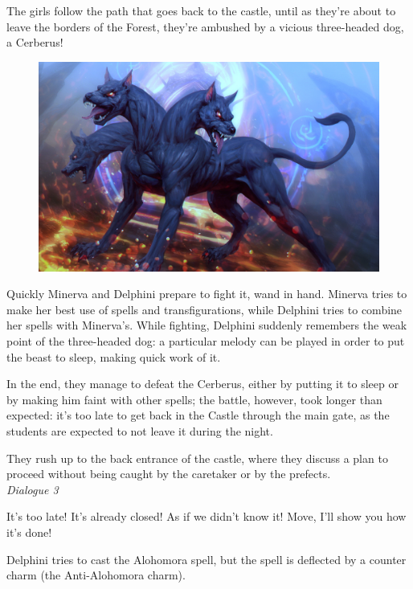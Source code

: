 The girls follow the path that goes back to the castle, until as they're about to leave the borders of the Forest, they're ambushed by a vicious three-headed dog, a Cerberus!\\

\begin{figure}[H]
\includegraphics[max width=\textwidth]{../Pictures/Level/Script/Cerberus_picture.jpg}
\end{figure}

Quickly Minerva and Delphini prepare to fight it, wand in hand. Minerva tries to make her best use of spells and transfigurations, while Delphini tries to combine her spells with Minerva's. While fighting, Delphini suddenly remembers the weak point of the three-headed dog: a particular melody can be played in order to put the beast to sleep, making quick work of it.

In the end, they manage to defeat the Cerberus, either by putting it to sleep or by making him faint with other spells; the battle, however, took longer than expected: it's too late to get back in the Castle through the main gate, as the students are expected to not leave it during the night.

They rush up to the back entrance of the castle, where they discuss a plan to proceed without being caught by the caretaker or by the prefects.\\

\textit{Dialogue 3}             
\begin{dialogue}
 It's too late! It's already closed!
 As if we didn't know it! Move, I'll show you how it's done!
\end{dialogue}

Delphini tries to cast the Alohomora spell, but the spell is deflected by a counter charm (the Anti-Alohomora charm).

